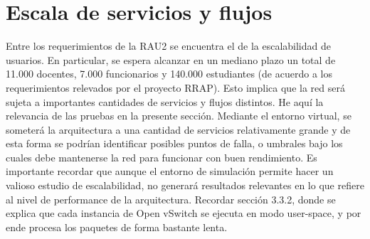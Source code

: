 \section{Escala de servicios y flujos}
Entre los requerimientos de la RAU2 se encuentra el de la escalabilidad de usuarios. En particular, se espera alcanzar en un mediano plazo un total de 11.000 docentes, 7.000 funcionarios y 140.000 estudiantes (de acuerdo a los requerimientos relevados por el proyecto RRAP). Esto implica que la red será sujeta a importantes cantidades de servicios y flujos distintos. He aquí la relevancia de las pruebas en la presente sección. Mediante el entorno virtual, se someterá la arquitectura a una cantidad de servicios relativamente grande y de esta forma se podrían identificar posibles puntos de falla, o umbrales bajo los cuales debe mantenerse la red para funcionar con buen rendimiento. Es importante recordar que aunque el entorno de simulación permite hacer un valioso estudio de escalabilidad, no generará resultados relevantes en lo que refiere al nivel de performance de la arquitectura. Recordar sección 3.3.2, donde se explica que cada instancia de Open vSwitch se ejecuta en modo user-space, y por ende procesa los paquetes de forma bastante lenta.

